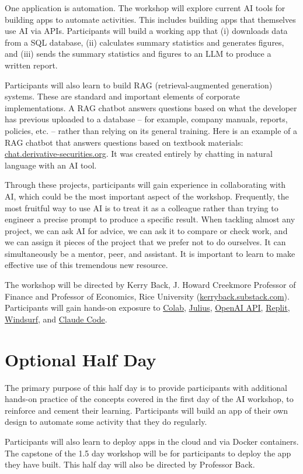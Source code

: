 \documentclass[11pt]{scrartcl}
\begin{document}
One application is automation. The workshop will explore current AI tools for building apps to automate activities. This includes building apps that themselves use AI via APIs. Participants will build a working app that (i) downloads data from a SQL database, (ii) calculates summary statistics and generates figures, and (iii) sends the summary statistics and figures to an LLM to produce a written report.

Participants will also learn to build RAG (retrieval-augmented generation) systems. These are standard and important elements of corporate implementations. A RAG chatbot answers questions based on what the developer has previous uploaded to a database -- for example, company manuals, reports, policies, etc. -- rather than relying on its general training. Here is an example of a RAG chatbot that answers questions based on textbook materials: \href{https://chat.derivative-securities.org}{chat.derivative-securities.org}. It was created entirely by chatting in natural language with an AI tool.

Through these projects, participants will gain experience in collaborating with AI, which could be the most important aspect of the workshop. Frequently, the most fruitful way to use AI is to treat it as a colleague rather than trying to engineer a precise prompt to produce a specific result. When tackling almost any project, we can ask AI for advice, we can ask it to compare or check work, and we can assign it pieces of the project that we prefer not to do ourselves. It can simultaneously be a mentor, peer, and assistant. It is important to learn to make effective use of this tremendous new resource.

The workshop will be directed by Kerry Back, J. Howard Creekmore Professor of Finance and Professor of Economics, Rice University (\href{https://kerryback.substack.com}{kerryback.substack.com}). Participants will gain hands-on exposure to \href{https://colab.research.google.com/#scrollTo=Wf5KrEb6vrkR}{Colab}, 
\href{https://julius.ai/}{Julius}, 
\href{https://openai.com/api/}{OpenAI API}, 
\href{https://replit.com/}{Replit}, 
\href{https://windsurf.com/}{Windsurf}, and 
\href{https://www.anthropic.com/claude-code}{Claude Code}.

\section*{Optional Half Day}

The primary purpose of this half day is to provide participants with additional hands-on practice of the concepts covered in the first day of the AI workshop, to reinforce and cement their learning.  Participants will build an app of their own design to automate some activity that they do regularly.  

Participants will also learn to deploy apps in the cloud and via Docker containers.  The capstone of the 1.5 day workshop will be for participants to deploy the app they have built.  This half day will also be directed by Professor Back.
\end{document}
